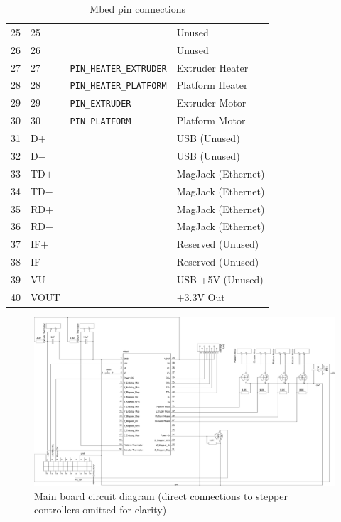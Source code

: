 \begin{table}
\begin{tabular}{l l l l}
				25 & 25  & & Unused \\
				26 & 26  & & Unused \\
				27 & 27  & \verb|PIN_HEATER_EXTRUDER| & Extruder Heater \\
				28 & 28  & \verb|PIN_HEATER_PLATFORM| & Platform Heater \\
				29 & 29  & \verb|PIN_EXTRUDER| & Extruder Motor \\
				30 & 30  & \verb|PIN_PLATFORM| & Platform Motor \\
				31 & D$+$  & & USB (Unused) \\
				32 & D$-$  & & USB (Unused) \\
				33 & TD$+$ & & MagJack (Ethernet) \\
				34 & TD$-$ & & MagJack (Ethernet) \\
				35 & RD$+$ & & MagJack (Ethernet) \\
				36 & RD$-$ & & MagJack (Ethernet) \\
				37 & IF$+$ & & Reserved (Unused) \\
				38 & IF$-$ & & Reserved (Unused) \\
				39 & VU    & & USB +5V (Unused) \\
				40 & VOUT  & & +3.3V Out \\
				\bottomrule
			\end{tabular}
			
			\caption{Mbed pin connections}
			\label{tab:mbed}
		\end{table}
			
		\begin{landscape}
			\begin{figure}
				\includegraphics[width=1.5\textheight]{circuits/electronics.pdf}
				\caption{Main board circuit diagram (direct connections to stepper controllers
				         omitted for clarity)}
				\label{fig:electronics}
			\end{figure}
		\end{landscape}
	
